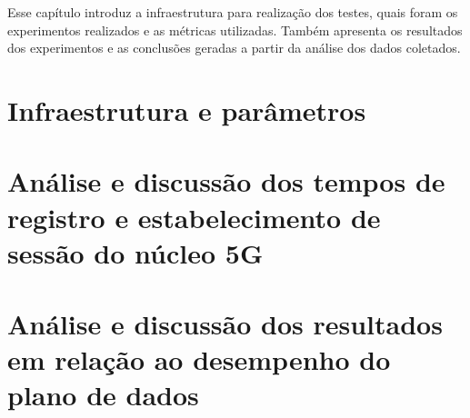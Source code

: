 Esse capítulo introduz a infraestrutura para realização dos testes, quais foram os experimentos realizados e as métricas utilizadas. Também apresenta os resultados dos experimentos e as conclusões geradas a partir da análise dos dados coletados.

\section{Infraestrutura e parâmetros}


\section{Análise e discussão dos tempos de registro e estabelecimento de sessão do núcleo 5G}


\section{Análise e discussão dos resultados em relação ao desempenho do plano de dados}


% 



